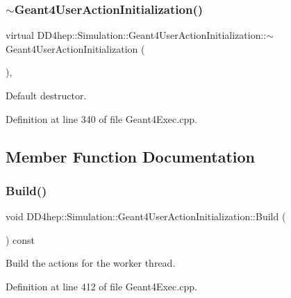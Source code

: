 \subsubsection{\texorpdfstring{$\sim$\+Geant4\+User\+Action\+Initialization()}{~Geant4UserActionInitialization()}}
{\footnotesize\ttfamily virtual D\+D4hep\+::\+Simulation\+::\+Geant4\+User\+Action\+Initialization\+::$\sim$\+Geant4\+User\+Action\+Initialization (\begin{DoxyParamCaption}{ }\end{DoxyParamCaption})\hspace{0.3cm}{\ttfamily [inline]}, {\ttfamily [virtual]}}



Default destructor. 



Definition at line 340 of file Geant4\+Exec.\+cpp.



\subsection{Member Function Documentation}
\hypertarget{class_d_d4hep_1_1_simulation_1_1_geant4_user_action_initialization_a40c0a5ec6b6620b04fd2f350c6b2d64d}{}\label{class_d_d4hep_1_1_simulation_1_1_geant4_user_action_initialization_a40c0a5ec6b6620b04fd2f350c6b2d64d} 
\subsubsection{\texorpdfstring{Build()}{Build()}}
{\footnotesize\ttfamily void D\+D4hep\+::\+Simulation\+::\+Geant4\+User\+Action\+Initialization\+::\+Build (\begin{DoxyParamCaption}{ }\end{DoxyParamCaption}) const\hspace{0.3cm}{\ttfamily [virtual]}}



Build the actions for the worker thread. 



Definition at line 412 of file Geant4\+Exec.\+cpp.



